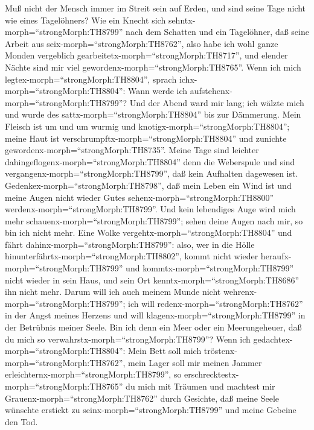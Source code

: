  Muß nicht der Mensch immer im Streit sein auf Erden, und
sind seine Tage nicht wie eines Tagelöhners?  Wie ein Knecht
sich sehntx-morph=``strongMorph:TH8799'' nach dem Schatten und ein
Tagelöhner, daß seine Arbeit aus seix-morph=``strongMorph:TH8762'',
 also habe ich wohl ganze Monden vergeblich
gearbeitetx-morph=``strongMorph:TH8717'', und elender Nächte sind mir
viel gewordenx-morph=``strongMorph:TH8765''.  Wenn ich mich
legtex-morph=``strongMorph:TH8804'', sprach
ichx-morph=``strongMorph:TH8804'': Wann werde ich
aufstehenx-morph=``strongMorph:TH8799''? Und der Abend ward mir lang;
ich wälzte mich und wurde des sattx-morph=``strongMorph:TH8804'' bis zur
Dämmerung.  Mein Fleisch ist um und um wurmig und
knotigx-morph=``strongMorph:TH8804''; meine Haut ist
verschrumpftx-morph=``strongMorph:TH8804'' und zunichte
gewordenx-morph=``strongMorph:TH8735''.  Meine Tage sind
leichter dahingeflogenx-morph=``strongMorph:TH8804'' denn die Weberspule
und sind vergangenx-morph=``strongMorph:TH8799'', daß kein Aufhalten
dagewesen ist.  Gedenkex-morph=``strongMorph:TH8798'', daß
mein Leben ein Wind ist und meine Augen nicht wieder Gutes
sehenx-morph=``strongMorph:TH8800''
werdenx-morph=``strongMorph:TH8799''.  Und kein lebendiges
Auge wird mich mehr schauenx-morph=``strongMorph:TH8799''; sehen deine
Augen nach mir, so bin ich nicht mehr.  Eine Wolke
vergehtx-morph=``strongMorph:TH8804'' und fährt
dahinx-morph=``strongMorph:TH8799'': also, wer in die Hölle
hinunterfährtx-morph=``strongMorph:TH8802'', kommt nicht wieder
heraufx-morph=``strongMorph:TH8799''  und
kommtx-morph=``strongMorph:TH8799'' nicht wieder in sein Haus, und sein
Ort kenntx-morph=``strongMorph:TH8686'' ihn nicht mehr. 
Darum will ich auch meinem Munde nicht
wehrenx-morph=``strongMorph:TH8799''; ich will
redenx-morph=``strongMorph:TH8762'' in der Angst meines Herzens und will
klagenx-morph=``strongMorph:TH8799'' in der Betrübnis meiner Seele.
 Bin ich denn ein Meer oder ein Meerungeheuer, daß du mich
so verwahrstx-morph=``strongMorph:TH8799''?  Wenn ich
gedachtex-morph=``strongMorph:TH8804'': Mein Bett soll mich
tröstenx-morph=``strongMorph:TH8762'', mein Lager soll mir meinen Jammer
erleichternx-morph=``strongMorph:TH8799'',  so
erschrecktestx-morph=``strongMorph:TH8765'' du mich mit Träumen und
machtest mir Grauenx-morph=``strongMorph:TH8762'' durch Gesichte,
 daß meine Seele wünschte erstickt zu
seinx-morph=``strongMorph:TH8799'' und meine Gebeine den Tod.
